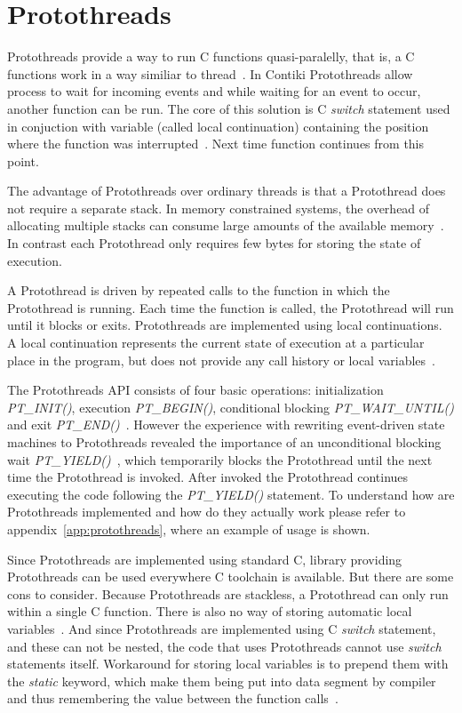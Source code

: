 
\section{Protothreads}\label{sec:contiki-protothreads}
Protothreads provide a way to run C functions quasi-paralelly,
that is, a C functions work in a way similiar to thread~\cite{paper-protothreads}.
In Contiki Protothreads allow process to wait for incoming events and
while waiting for an event to occur, another function can be run.
The core of this solution is C {\it switch} statement used in conjuction with variable (called local continuation)
containing the position where the function was interrupted~\cite{paper-protothreads}.
Next time function continues from this point.

The advantage of Protothreads over ordinary threads is that a Protothread does not require a separate stack.
In memory constrained systems, the overhead of allocating multiple stacks can consume large amounts of
the available memory~\cite{paper-protothreads}.
In contrast each Protothread only requires few bytes for storing the state of execution.

A Protothread is driven by repeated calls to the function in which the Protothread is running.
Each time the function is called, the Protothread will run until it blocks or exits.
Protothreads are implemented using local continuations. A local continuation represents the current state
of execution at a particular place in the program, but does not provide any call history or local variables~\cite{contiki-docs}.

The Protothreads API consists of four basic operations: initialization {\it{PT\_INIT()}}, execution {\it{PT\_BEGIN()}},
conditional blocking {\it{PT\_WAIT\_UNTIL()}} and exit {\it{PT\_END()}}~\cite{paper-protothreads}.
However the experience with rewriting event-driven state machines to Protothreads revealed
the importance of an unconditional blocking wait {\it{PT\_YIELD()}}~\cite{thesis-programming},
which temporarily blocks the Protothread until the next time the Protothread is invoked.
After invoked the Protothread continues executing the code following the {\it{PT\_YIELD()}} statement.
To understand how are Protothreads implemented and how do they actually work please refer
to appendix~\ref{app:protothreads}, where an example of usage is shown.

Since Protothreads are implemented using standard C, library providing Protothreads can be used everywhere C toolchain is available.
But there are some cons to consider. Because Protothreads are stackless, a Protothread can only run within a single C function.
There is also no way of storing automatic local variables~\cite{contiki-docs}.
And since Protothreads are implemented using C {\it switch} statement, and these can
not be nested, the code that uses Protothreads cannot use {\it switch} statements itself.
Workaround for storing local variables is to prepend them with the {\it static} keyword, which make them being put into data segment
by compiler and thus remembering the value between the function calls~\cite{paper-protothreads}.
